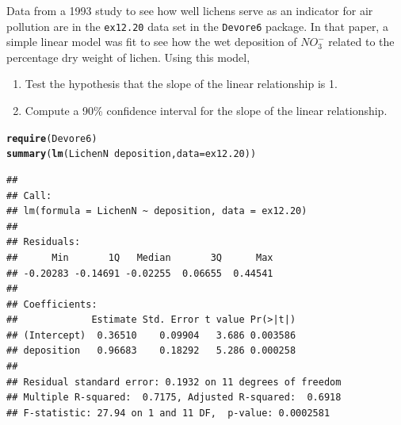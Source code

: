 \documentclass[twoside]{book}
\makeatletter
\newcommand{\hlopt}[1]{\textcolor[rgb]{0,0,0}{#1}}%
\newcommand{\hlstd}[1]{\textcolor[rgb]{0.345,0.345,0.345}{#1}}%
\newcommand{\hlkwc}[1]{\textcolor[rgb]{0.333,0.667,0.333}{#1}}%
\newcommand{\hlkwd}[1]{\textcolor[rgb]{0.737,0.353,0.396}{\textbf{#1}}}%
\newenvironment{kframe}{%
 \def\at@end@of@kframe{}%
 \ifinner\ifhmode%
  \def\at@end@of@kframe{\end{minipage}}%
  \begin{minipage}{\columnwidth}%
 \fi\fi%
 \def\FrameCommand##1{\hskip\@totalleftmargin \hskip-\fboxsep
 \colorbox{shadecolor}{##1}\hskip-\fboxsep
     \hskip-\linewidth \hskip-\@totalleftmargin \hskip\columnwidth}%
 \MakeFramed {\advance\hsize-\width
   \@totalleftmargin\z@ \linewidth\hsize
   \@setminipage}}%
 {\par\unskip\endMakeFramed%
 \at@end@of@kframe}
\newenvironment{knitrout}{}{} %
\newcommand{\Rindex}[1]{\index{\texttt{#1}}}
\newcommand{\dataframe}[1]{{\color{blue!80!black}\texttt{#1}}\Rindex{#1}}
\newcommand{\pkg}[1]{{\color{red!80!black}\texttt{#1}}\Rindex{#1}}
\makeatother
\begin{document}
\begin{problem}
	Data from a 1993 study to see how well lichens serve as an indicator for air pollution are in the 
	\dataframe{ex12.20} data set in the \pkg{Devore6} package. 
	In that paper, a simple linear model was fit to see how the wet deposition of $NO^{-}_3$ 
	related to the percentage dry weight of lichen.
	Using this model, 
	\begin{enumerate}
		\item
			Test the hypothesis that the slope of the linear relationship is 1.
		\item
			Compute a 90\% confidence interval for the slope of the linear relationship.
	\end{enumerate}
\begin{knitrout}
\color{fgcolor}\begin{kframe}
\begin{alltt}
\hlkwd{require}\hlstd{(Devore6)}
\hlkwd{summary}\hlstd{(}\hlkwd{lm}\hlstd{(LichenN} \hlopt{~} \hlstd{deposition,} \hlkwc{data} \hlstd{= ex12.20))}
\end{alltt}
\begin{verbatim}
## 
## Call:
## lm(formula = LichenN ~ deposition, data = ex12.20)
## 
## Residuals:
##      Min       1Q   Median       3Q      Max 
## -0.20283 -0.14691 -0.02255  0.06655  0.44541 
## 
## Coefficients:
##             Estimate Std. Error t value Pr(>|t|)
## (Intercept)  0.36510    0.09904   3.686 0.003586
## deposition   0.96683    0.18292   5.286 0.000258
## 
## Residual standard error: 0.1932 on 11 degrees of freedom
## Multiple R-squared:  0.7175,	Adjusted R-squared:  0.6918 
## F-statistic: 27.94 on 1 and 11 DF,  p-value: 0.0002581
\end{verbatim}
\end{kframe}
\end{knitrout}
\end{problem}
\end{document}
